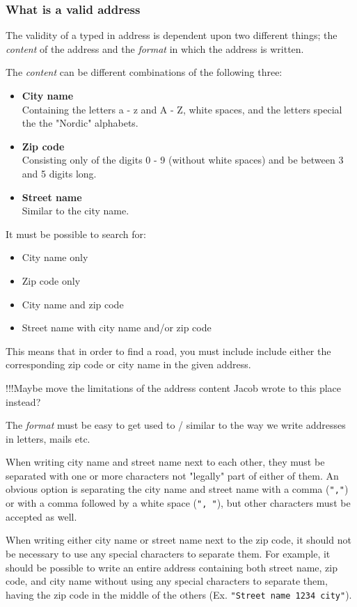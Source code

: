 \documentclass[a4paper,11pt]{article}
\begin{document}
\subsubsection{What is a valid address}
The validity of a typed in address is dependent upon two different things; the \textit{content} of the address and the \textit{format} in which the address is written.

The \textit{content} can be different combinations of the following three:
\begin{itemize}
	\item \textbf{City name} \\
		Containing the letters a - z and A - Z, white spaces, and the letters special the the "Nordic" alphabets.
	\item \textbf{Zip code} \\
		Consisting only of the digits 0 - 9 (without white spaces) and be between 3 and 5 digits long.
	\item \textbf{Street name} \\
		Similar to the city name.
\end{itemize}
It must be possible to search for:
\begin{itemize}
	\item City name only
	\item Zip code only
	\item City name and zip code
	\item Street name with city name and/or zip code
\end{itemize}
This means that in order to find a road, you must include include either the corresponding zip code or city name in the given address.

!!!Maybe move the limitations of the address content Jacob wrote to this place instead?

The \textit{format} must be easy to get used to / similar to the way we write addresses in letters, mails etc.

When writing city name and street name next to each other, they must be separated with one or more characters not "legally" part of either of them. An obvious option is separating the city name and street name with a comma (\texttt{","}) or with a comma followed by a white space (\texttt{", "}), but other characters must be accepted as well.

When writing either city name or street name next to the zip code, it should not be necessary to use any special characters to separate them. For example, it should be possible to write an entire address containing both street name, zip code, and city name without using any special characters to separate them, having the zip code in the middle of the others (Ex. \texttt{"Street name 1234 city"}).
\end{document}
